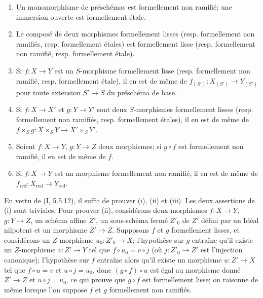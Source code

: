 \begin{remarks}[17.1.2]
\begin{enumerate}
\end{enumerate}
\end{remarks}

\begin{proposition}[17.1.3]
\label{IV.17.1.3}
\begin{enumerate}
  \item[(i)] Un monomorphisme de préschémas est formellement non ramifié; une immersion ouverte est formellement étale.
  \item[(ii)] Le composé de deux morphismes formellement lisses (resp. formellement non ramifiés, resp. formellement étales) est formellement lisse (resp. formellement non ramifié, resp. formellement étale).
  \item[(iii)] Si $f:X\to Y$ est un $S$-morphisme formellement lisse (resp. formellement non ramifié, resp. formellement étale), il en est de même de $f_{(S')}:X_{(S')}\to Y_{(S')}$ pour toute extension $S'\to S$ du préschéma de base.
  \item[(iv)] Si $f:X\to X'$ et $g:Y\to Y'$ sont deux $S$-morphismes formellement lisses (resp. formellement non ramifiés, resp. formellement étales), il en est de même de $f\times_S g:X\times_S Y\to X'\times_S Y'$.
  \item[(v)] Soient $f:X\to Y$, $g:Y\to Z$ deux morphismes; si $g\circ f$ est formellement non ramifié, il en est de même de $f$.
  \item[(vi)] Si $f:X\to Y$ est un morphisme formellement non ramifié, il en est de même de $f_{\mathrm{red}}:X_{\mathrm{red}}\to Y_{\mathrm{red}}$.
\end{enumerate}
\end{proposition}

En vertu de (I, 5.5.12), il suffit de prouver (i), (ii) et (iii). Les deux assertions de (i) sont triviales. Pour prouver (ii), considérons deux morphismes $f:X\to Y$, $g:Y\to Z$, un schéma affine $Z'$, un sous-schéma fermé $Z'_0$ de $Z'$ défini par un Idéal nilpotent et un morphisme $Z'\to Z$. Supposons $f$ et $g$ formellement lisses, et considérons un
$Z$-morphisme $u_0:Z'_0\to X$; l'hypothèse sur $g$ entraîne qu'il existe un $Z$-morphisme $v:Z'\to Y$ tel que $f\circ u_0=v\circ j$ (où $j:Z'_0\to Z'$ est l'injection canonique); l'hypothèse sur $f$ entraîne alors qu'il existe un morphisme $u:Z'\to X$ tel que $f\circ u=v$ et $u\circ j=u_0$, donc $(g\circ f)\circ u$ est égal au morphisme donné $Z'\to Z$ et $u\circ j=u_0$, ce qui prouve que $g\circ f$ est formellement lisse; on raisonne de même lorsque l'on suppose $f$ et $g$ formellement non ramifiés.

